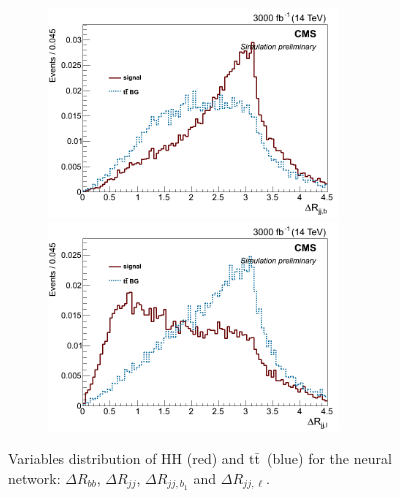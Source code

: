 \documentclass[10pt,a4paper]{article}
\newcommand{\ww}{7.7cm} %
\newcommand{\dd}{-2mm} %
\renewcommand{\tt}{\ensuremath{\text{t}\bar{\text{t}}}}
\begin{document}
\begin{figure}[h]
  \begin{subfigure}[b]{17cm}
    \begin{minipage}[h!]{\ww}
      \centering
      \includegraphics[width=\ww]{figs/DeltaR_jjb.png}
    \end{minipage}
    \begin{minipage}[h!]{\ww}
      \centering
      \includegraphics[width=\ww]{figs/DeltaR_jjl.png}
    \end{minipage}
  \end{subfigure}	
  \vspace{\dd} 
  \caption{Variables distribution of HH (red) and \tt\ (blue) for the neural network: $\Delta R_{bb}$, $\Delta R_{jj}$, $\Delta R_{jj,b_1}$ and $\Delta R_{jj,\ell}$.} \label{vars6}

\end{figure}
\end{document}
